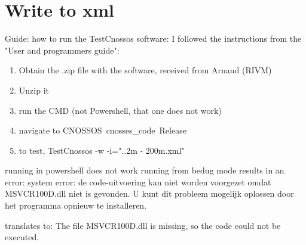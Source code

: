
\section{Write to xml}
Guide: how to run the TestCnossos software:
I followed the instructions from the "User and programmers guide":
\begin{enumerate}
	\item Obtain the .zip file with the software, received from Arnaud (RIVM)
	\item Unzip it
	\item run the CMD (not Powershell, that one does not work)
	\item navigate to CNOSSOS\ cnosses_code\ Release
	\item to test, TestCnossos -w -i="..\data\barrier 2m - 200m.xml"
\end{enumerate}

running in powershell does not work
running from bedug mode results in an error: system error:
de code-uitvoering kan niet worden voorgezet omdat MSVCR100D.dll niet is gevonden. U kunt dit probleem mogelijk oplossen door het programma opnieuw te installeren.

translates to: The file MSVCR100D.dll is missing, so the code could not be executed.